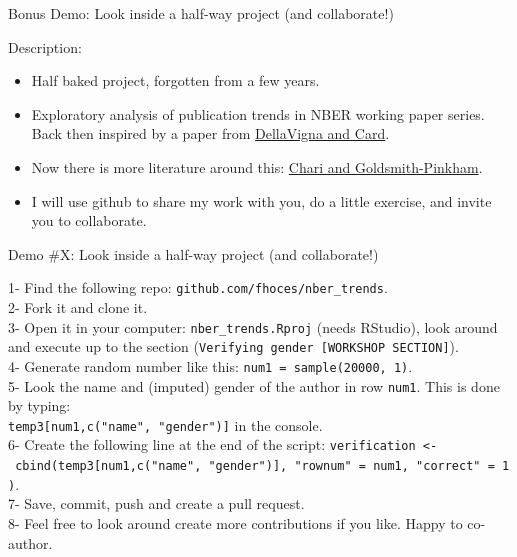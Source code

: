\documentclass[ignorenonframetext,]{beamer}
\begin{document}
\begin{frame}{Bonus Demo: Look inside a half-way project (and
collaborate!)}
\protect\hypertarget{bonus-demo-look-inside-a-half-way-project-and-collaborate}{}

Description:

\begin{itemize}
\item
  Half baked project, forgotten from a few years.\\
\item
  Exploratory analysis of publication trends in NBER working paper
  series. Back then inspired by a paper from
  \href{https://eml.berkeley.edu/~sdellavi/wp/CardDellaVignaTop5PapersJEL2013.pdf}{DellaVigna
  and Card}.\\
\item
  Now there is more literature around this:
  \href{http://www.nber.org/papers/w23953}{Chari and Goldsmith-Pinkham}.
\item
  I will use github to share my work with you, do a little exercise, and
  invite you to collaborate.
\end{itemize}

\end{frame}

\begin{frame}[fragile]{Demo \#X: Look inside a half-way project (and
collaborate!)}
\protect\hypertarget{demo-x-look-inside-a-half-way-project-and-collaborate}{}

1- Find the following repo: \texttt{github.com/fhoces/nber\_trends}.\\
2- Fork it and clone it.\\
3- Open it in your computer: \texttt{nber\_trends.Rproj} (needs
RStudio), look around and execute up to the section
(\texttt{Verifying\ gender\ {[}WORKSHOP\ SECTION{]}}).\\
4- Generate random number like this:
\texttt{num1\ =\ sample(20000,\ 1)}.\\
5- Look the name and (imputed) gender of the author in row
\texttt{num1}. This is done by typing:\\
\texttt{temp3{[}num1,c("name",\ "gender"){]}} in the console.\\
6- Create the following line at the end of the script:
\texttt{verification\ \textless{}-\ cbind(temp3{[}num1,c("name",\ "gender"){]},\ "rownum"\ =\ num1,\ "correct"\ =\ 1)}.\\
7- Save, commit, push and create a pull request.\\
8- Feel free to look around create more contributions if you like. Happy
to co-author.

\end{frame}
\end{document}
